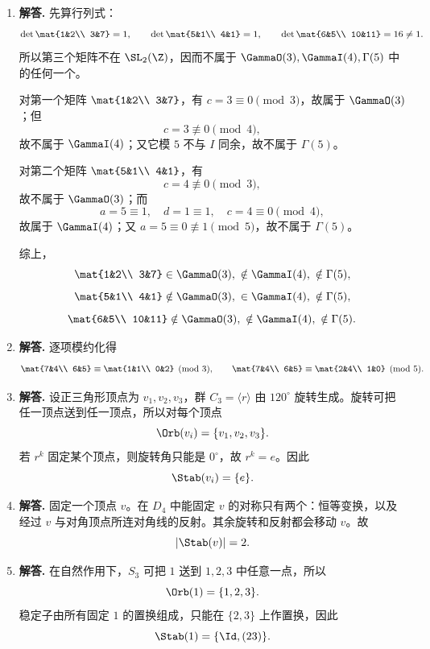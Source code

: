 \begin{enumerate}[label=\textbf{\arabic*.}, leftmargin=*, itemsep=1em]
\item \textbf{解答.} 先算行列式：
\[
\det\mat{1&2\\ 3&7}=1,\qquad
\det\mat{5&1\\ 4&1}=1,\qquad
\det\mat{6&5\\ 10&11}=16\neq 1.
\]
所以第三个矩阵不在 $\SL_2(\Z)$，因而不属于 $\GammaO(3),\GammaI(4),\Gamma(5)$ 中的任何一个。

对第一个矩阵 $\mat{1&2\\ 3&7}$，有 $c=3\equiv0\pmod 3$，故属于 $\GammaO(3)$；但
\[
c=3\not\equiv 0\pmod 4,
\]
故不属于 $\GammaI(4)$；又它模 $5$ 不与 $I$ 同余，故不属于 $\Gamma(5)$。

对第二个矩阵 $\mat{5&1\\ 4&1}$，有
\[
c=4\not\equiv0\pmod 3,
\]
故不属于 $\GammaO(3)$；而
\[
a=5\equiv1,\quad d=1\equiv1,\quad c=4\equiv0\pmod 4,
\]
故属于 $\GammaI(4)$；又 $a=5\equiv0\not\equiv1\pmod 5$，故不属于 $\Gamma(5)$。

综上，
\[
\mat{1&2\\ 3&7}\in \GammaO(3),\ \notin \GammaI(4),\ \notin \Gamma(5),
\]
\[
\mat{5&1\\ 4&1}\notin \GammaO(3),\ \in \GammaI(4),\ \notin \Gamma(5),
\]
\[
\mat{6&5\\ 10&11}\notin \GammaO(3),\ \notin \GammaI(4),\ \notin \Gamma(5).
\]

\item \textbf{解答.} 逐项模约化得
\[
\mat{7&4\\ 6&5}\equiv \mat{1&1\\ 0&2}\pmod 3,
\qquad
\mat{7&4\\ 6&5}\equiv \mat{2&4\\ 1&0}\pmod 5.
\]

\item \textbf{解答.} 设正三角形顶点为 $v_1,v_2,v_3$，群 $C_3=\langle r\rangle$ 由 $120^\circ$ 旋转生成。旋转可把任一顶点送到任一顶点，所以对每个顶点
\[
\Orb(v_i)=\{v_1,v_2,v_3\}.
\]
若 $r^k$ 固定某个顶点，则旋转角只能是 $0^\circ$，故 $r^k=e$。因此
\[
\Stab(v_i)=\{e\}.
\]

\item \textbf{解答.} 固定一个顶点 $v$。在 $D_4$ 中能固定 $v$ 的对称只有两个：恒等变换，以及经过 $v$ 与对角顶点所连对角线的反射。其余旋转和反射都会移动 $v$。故
\[
|\Stab(v)|=2.
\]

\item \textbf{解答.} 在自然作用下，$S_3$ 可把 $1$ 送到 $1,2,3$ 中任意一点，所以
\[
\Orb(1)=\{1,2,3\}.
\]
稳定子由所有固定 $1$ 的置换组成，只能在 $\{2,3\}$ 上作置换，因此
\[
\Stab(1)=\{\Id,(23)\}.
\]


\end{enumerate}
